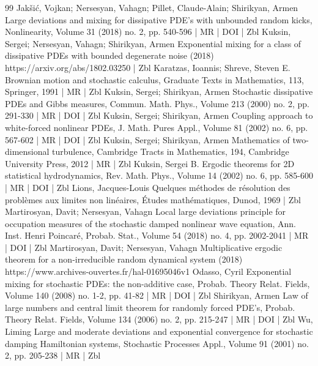 \documentclass[10pt]{amsart}
\theoremstyle{definition}\newtheorem{defi}[theo]{Definition}\newtheorem{rema}[theo]{Remark}\newtheorem{exam}[theo]{Example}\newtheorem{exem}[theo]{Example}\newtheorem{nota}[theo]{Notation}
\begin{document}
\begin{thebibliography}{99}
Jakšić, Vojkan; Nersesyan, Vahagn; Pillet, Claude-Alain; Shirikyan, Armen Large deviations and mixing for dissipative PDE’s with unbounded random kicks, Nonlinearity, Volume 31 (2018) no. 2, pp. 540-596 | MR | DOI | Zbl
Kuksin, Sergei; Nersesyan, Vahagn; Shirikyan, Armen Exponential mixing for a class of dissipative PDEs with bounded degenerate noise (2018) https://arxiv.org/abs/1802.03250 | Zbl
Karatzas, Ioannis; Shreve, Steven E. Brownian motion and stochastic calculus, Graduate Texts in Mathematics, 113, Springer, 1991 | MR | Zbl
Kuksin, Sergei; Shirikyan, Armen Stochastic dissipative PDEs and Gibbs measures, Commun. Math. Phys., Volume 213 (2000) no. 2, pp. 291-330 | MR | DOI | Zbl
Kuksin, Sergei; Shirikyan, Armen Coupling approach to white-forced nonlinear PDEs, J. Math. Pures Appl., Volume 81 (2002) no. 6, pp. 567-602 | MR | DOI | Zbl
Kuksin, Sergei; Shirikyan, Armen Mathematics of two-dimensional turbulence, Cambridge Tracts in Mathematics, 194, Cambridge University Press, 2012 | MR | Zbl
Kuksin, Sergei B. Ergodic theorems for 2D statistical hydrodynamics, Rev. Math. Phys., Volume 14 (2002) no. 6, pp. 585-600 | MR | DOI | Zbl
Lions, Jacques-Louis Quelques méthodes de résolution des problèmes aux limites non linéaires, Études mathématiques, Dunod, 1969 | Zbl
Martirosyan, Davit; Nersesyan, Vahagn Local large deviations principle for occupation measures of the stochastic damped nonlinear wave equation, Ann. Inst. Henri Poincaré, Probab. Stat., Volume 54 (2018) no. 4, pp. 2002-2041 | MR | DOI | Zbl
Martirosyan, Davit; Nersesyan, Vahagn Multiplicative ergodic theorem for a non-irreducible random dynamical system (2018) https://www.archives-ouvertes.fr/hal-01695046v1
Odasso, Cyril Exponential mixing for stochastic PDEs: the non-additive case, Probab. Theory Relat. Fields, Volume 140 (2008) no. 1-2, pp. 41-82 | MR | DOI | Zbl
Shirikyan, Armen Law of large numbers and central limit theorem for randomly forced PDE’s, Probab. Theory Relat. Fields, Volume 134 (2006) no. 2, pp. 215-247 | MR | DOI | Zbl
Wu, Liming Large and moderate deviations and exponential convergence for stochastic damping Hamiltonian systems, Stochastic Processes Appl., Volume 91 (2001) no. 2, pp. 205-238 | MR | Zbl
\end{thebibliography}
\end{document}
